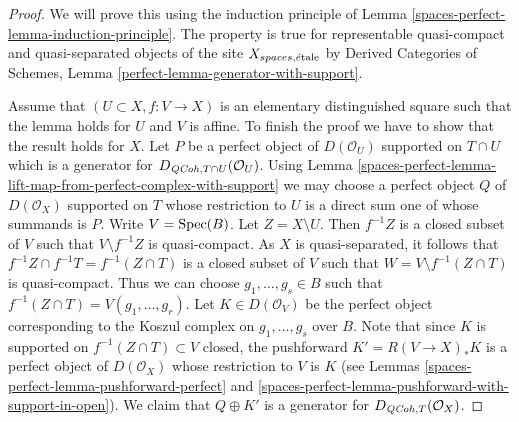 \begin{proof}
We will prove this using the induction principle of
Lemma \ref{spaces-perfect-lemma-induction-principle}.
The property is true for representable quasi-compact
and quasi-separated objects of the site
$X_{spaces, \acute{e}\text{tale}}$ by
Derived Categories of Schemes, Lemma
\ref{perfect-lemma-generator-with-support}.

\medskip\noindent
Assume that $(U \subset X, f : V \to X)$ is an elementary distinguished
square such that the lemma holds for $U$ and $V$ is affine. To finish
the proof we have to show that the result holds for $X$.
Let $P$ be a perfect object of $D(\mathcal{O}_U)$ supported on $T \cap U$
which is a generator for $D_{\mathit{QCoh}, T \cap U}(\mathcal{O}_U)$. Using
Lemma \ref{spaces-perfect-lemma-lift-map-from-perfect-complex-with-support}
we may choose a perfect object $Q$ of $D(\mathcal{O}_X)$ supported on $T$
whose restriction to $U$ is a direct sum one of whose summands is $P$.
Write $V = \operatorname{Spec}(B)$. Let $Z = X \setminus U$. Then $f^{-1}Z$ is a closed
subset of $V$ such that $V \setminus f^{-1}Z$ is quasi-compact. As $X$
is quasi-separated, it follows that
$f^{-1}Z \cap f^{-1}T = f^{-1}(Z \cap T)$ is a closed
subset of $V$ such that $W = V \setminus f^{-1}(Z \cap T)$ is quasi-compact.
Thus we can choose $g_1, \ldots, g_s \in B$ such that
$f^{-1}(Z \cap T) = V(g_1, \ldots, g_r)$.
Let $K \in D(\mathcal{O}_V)$ be the perfect object corresponding to the
Koszul complex on $g_1, \ldots, g_s$ over $B$. Note that since $K$ is
supported on $f^{-1}(Z \cap T) \subset V$ closed, the pushforward
$K' = R(V \to X)_*K$ is a perfect object of $D(\mathcal{O}_X)$ whose
restriction to $V$ is $K$ (see Lemmas \ref{spaces-perfect-lemma-pushforward-perfect}
and \ref{spaces-perfect-lemma-pushforward-with-support-in-open}).
We claim that $Q \oplus K'$ is a generator for
$D_{\mathit{QCoh}, T}(\mathcal{O}_X)$.


\end{proof}
